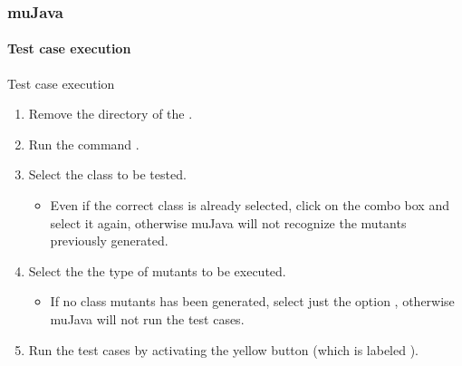 \begin{frame}
\frametitle{muJava}
\framesubtitle{Test case execution}

\begin{block:procedure}{Test case execution}
\begin{enumerate}
	\item Remove the directory  of the
	.

	\item Run the command .

	\item Select the class to be tested.
	\begin{itemize}
		\item Even if the correct class is already selected, click on the combo
		box and select it again, otherwise muJava will not recognize the
		mutants previously generated.
	\end{itemize}

	\item Select the the type of mutants to be executed.
	\begin{itemize}
		\item If no class mutants has been generated, select just the option
		, otherwise muJava will not
		run the test cases.
	\end{itemize}

	\item Run the test cases by activating the yellow button (which is labeled
	).
\end{enumerate}
\end{block:procedure}
\end{frame}